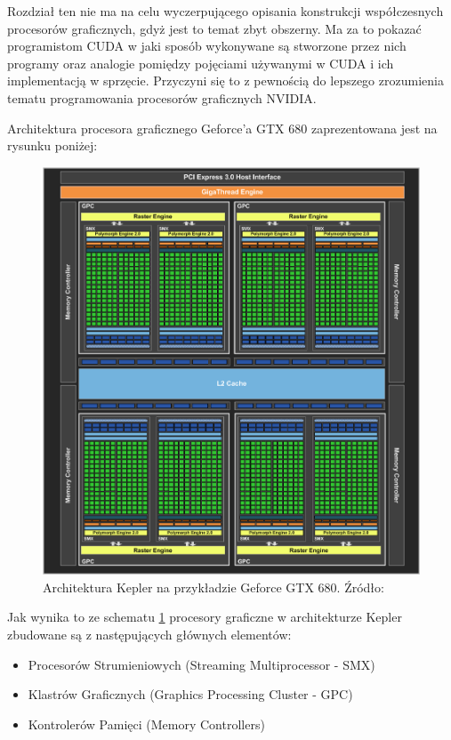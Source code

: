 Rozdział ten nie ma na celu wyczerpującego opisania konstrukcji współczesnych
procesorów graficznych, gdyż jest to temat zbyt obszerny. Ma za to 
pokazać programistom CUDA w jaki sposób wykonywane są stworzone
przez nich programy oraz analogie pomiędzy pojęciami używanymi w CUDA i ich
implementacją w sprzęcie. Przyczyni się to z pewnością do lepszego zrozumienia tematu
programowania procesorów graficznych NVIDIA.

Architektura procesora graficznego Geforce'a GTX 680 zaprezentowana jest na
rysunku poniżej:

\begin{figure}[H]
\centering
\includegraphics[scale=0.4]{images/kepler-overview.png}
\caption{Architektura Kepler na przykładzie Geforce GTX 680. Źródło: \cite{gf680}}
\label{gf880}
\end{figure}

Jak wynika to ze schematu \ref{gf880} procesory graficzne w architekturze Kepler
zbudowane są z następujących głównych elementów\cite{gf680}:
\begin{itemize}
\item Procesorów Strumieniowych (Streaming Multiprocessor - SMX)
\item Klastrów Graficznych (Graphics Processing Cluster - GPC)
\item Kontrolerów Pamięci (Memory Controllers)
\end{itemize}

